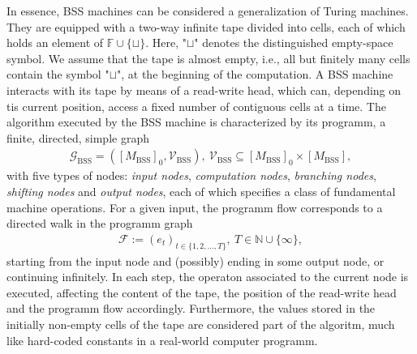 \documentclass[conference]{IEEEtran}
\def\G{{\mathcal G}}
\def\V{{\mathcal V}}
\def\F{{\mathcal F}}
\def\NN{{\mathbb N}}
\def\FF{{\mathbb F}}
\newcommand{\BSS}{\mathrm{BSS}}
\begin{document}
	In essence, BSS machines can be considered a generalization of Turing machines. They are equipped with a two-way infinite tape divided into cells, each of which holds an 
	element of \(\FF\cup\{\sqcup\}\). Here, "\(\sqcup\)" denotes the distinguished empty-space symbol. We assume that the tape is almost empty, i.e., all but finitely many cells 
	contain the symbol "\(\sqcup\)", at the beginning of the computation. A BSS machine interacts with its tape by means of a read-write head, which can, depending on tis current 
	position, access a fixed number of contiguous cells at a time. The algorithm executed by the BSS machine is characterized by its programm, a finite, directed, simple graph 
	\begin{align}   \G_\BSS = ([M_\BSS]_{0}, \V_\BSS),~ \V_\BSS \subseteq [M_\BSS]_{0} \times [M_\BSS],
	\end{align} 
	with five types of nodes: \emph{input nodes}, \emph{computation nodes}, \emph{branching nodes}, \emph{shifting nodes} and \emph{output nodes}, each of which specifies a class 
	of fundamental machine operations. For a given input, the programm flow corresponds to a directed walk in the programm graph
	\begin{align}	\F := (e_t)_{t\in\{1,2,\ldots,T\}},~T\in\NN\cup \{\infty\},
	\end{align}
	starting from the input node and (possibly) ending in some output node, or continuing infinitely. In each step, the operaton associated to the current node is executed, 
	affecting the content of the tape, the position of the read-write head and the programm flow accordingly. Furthermore, the values stored in the initially non-empty cells 
	of the tape are considered part of the algoritm, much like hard-coded constants in a real-world computer programm. 
\end{document}
